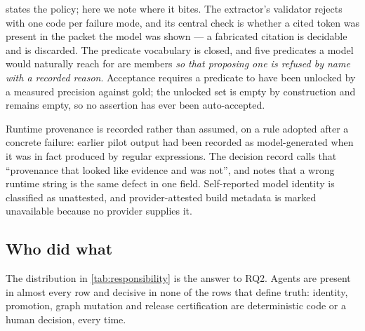  states the policy; here we note where it bites. The
extractor's validator rejects with one code per failure mode, and its central check
is whether a cited token was present in the packet the model was shown --- a
fabricated citation is decidable and is discarded. The predicate vocabulary is
closed, and five predicates a model would naturally reach for are members
\emph{so that proposing one is refused by name with a recorded reason}. Acceptance
requires a predicate to have been unlocked by a measured precision against gold; the
unlocked set is empty by construction and remains empty, so no assertion has ever
been auto-accepted.

Runtime provenance is recorded rather than assumed, on a rule adopted after a
concrete failure: earlier pilot output had been recorded as model-generated when it
was in fact produced by regular expressions. The decision record calls that
``provenance that looked like evidence and was not'', and notes that a wrong runtime
string is the same defect in one field. Self-reported model identity is classified as
unattested, and provider-attested build metadata is marked unavailable because no
provider supplies it.

\subsection{Who did what}



The distribution in \cref{tab:responsibility} is the answer to RQ2. Agents are
present in almost every row and decisive in none of the rows that define truth:
identity, promotion, graph mutation and release certification are deterministic code
or a human decision, every time.
